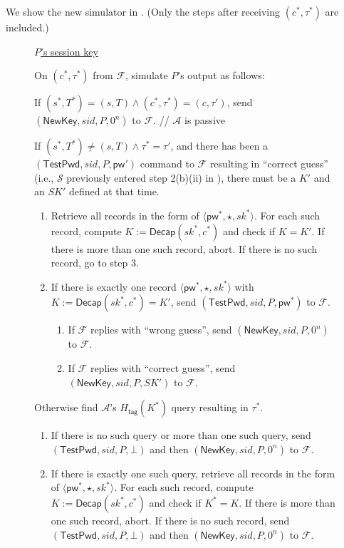 \documentclass{article}
\theoremstyle{plain}
\theoremstyle{definition}
\theoremstyle{remark}
\newcommand{\adv}{\mathcal{A}}
\renewcommand{\sim}{\mathcal{S}}
\newcommand{\func}{\mathcal{F}}
\newcommand{\Decap}{\mathsf{Decap}}
\newcommand{\Htag}{H_\mathsf{tag}}
\newcommand{\pw}{\mathsf{pw}}
\newcommand{\TestPwd}{\mathsf{TestPwd}}
\newcommand{\NewKey}{\mathsf{NewKey}}
\begin{document}
We show the new simulator in . (Only the steps after receiving $(c^*,\tau^*)$ are included.)

\begin{figure}[H]
\begin{framed}
\begin{small}
\underline{$P$'s session key}

\medskip
On $(c^*,\tau^*)$ from $\func$, simulate $P$'s output as follows:
\begin{enumerate}
  \item If $(s^*,T^*) = (s,T) \land (c^*,\tau^*) = (c,\tau')$, send $(\NewKey, sid, P, 0^n)$ to $\func$. \textcolor[gray]{0.5}{// $\adv$ is passive}
  {\color{blue}\item If $(s^*,T^*) \neq (s,T) \land \tau^* = \tau'$, and there has been a $(\TestPwd, sid, P, \pw')$ command to $\func$ resulting in ``correct guess'' (i.e., $\sim$ previously entered step 2(b)(ii) in ), there must be a $K'$ and an $SK'$ defined at that time.
      \begin{enumerate}
        \item Retrieve all records in the form of $\langle\pw^*,\star,sk^*\rangle$. For each such record, compute $K := \Decap(sk^*,c^*)$ and check if $K = K'$. If there is more than one such record, abort. If there is no such record, go to step 3.
        \item If there is exactly one record $\langle\pw^*,\star,sk^*\rangle$ with $K := \Decap(sk^*,c^*) = K'$, send $(\TestPwd, sid, P, \pw^*)$ to $\func$.
            \begin{enumerate}
              \item If $\func$ replies with ``wrong guess'', send $(\NewKey, sid, P, 0^n)$ to $\func$.
              \item If $\func$ replies with ``correct guess'', send $(\NewKey, sid, P, SK')$ to $\func$.
            \end{enumerate}
      \end{enumerate}
  }
  \item Otherwise find $\adv$'s {\color{blue}$\Htag(K^*)$} query resulting in $\tau^*$.
      \begin{enumerate}
        \item If there is no such query or more than one such query, send $(\TestPwd, sid, P, \bot)$ and then $(\NewKey, sid, P, 0^n)$ to $\func$.
        \item If there is exactly one such query, retrieve all records in the form of $\langle\pw^*,\star,sk^*\rangle$. For each such record, compute $K := \Decap(sk^*,c^*)$ and check if $K^* = K$. If there is more than one such record, abort. If there is no such record, send $(\TestPwd, sid, P, \bot)$ and then $(\NewKey, sid, P, 0^n)$ to $\func$.

\end{enumerate}
\end{enumerate}
\end{small}
\end{framed}
\end{figure}
\end{document}
